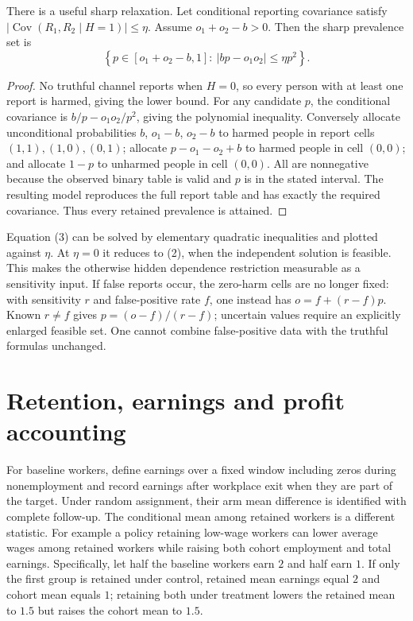 \documentclass[11pt,a4paper]{article}
\DeclareMathOperator{\Cov}{Cov}
\begin{document}
There is a useful sharp relaxation. Let conditional reporting covariance satisfy
$|\Cov(R_1,R_2\mid H=1)|\le\eta$. Assume $o_1+o_2-b>0$. Then the sharp prevalence set is
\[
 \left\{p\in[o_1+o_2-b,1]:\ |bp-o_1o_2|\le\eta p^2\right\}.
\tag{3}
\]
\begin{proof}
No truthful channel reports when $H=0$, so every person with at least one report is harmed, giving the lower bound. For any candidate $p$, the conditional covariance is $b/p-o_1o_2/p^2$, giving the polynomial inequality. Conversely allocate unconditional probabilities $b$, $o_1-b$, $o_2-b$ to harmed people in report cells $(1,1),(1,0),(0,1)$; allocate $p-o_1-o_2+b$ to harmed people in cell $(0,0)$; and allocate $1-p$ to unharmed people in cell $(0,0)$. All are nonnegative because the observed binary table is valid and $p$ is in the stated interval. The resulting model reproduces the full report table and has exactly the required covariance. Thus every retained prevalence is attained.
\end{proof}
Equation (3) can be solved by elementary quadratic inequalities and plotted against $\eta$. At $\eta=0$ it reduces to (2), when the independent solution is feasible. This makes the otherwise hidden dependence restriction measurable as a sensitivity input. If false reports occur, the zero-harm cells are no longer fixed: with sensitivity $r$ and false-positive rate $f$, one instead has $o=f+(r-f)p$. Known $r\ne f$ gives $p=(o-f)/(r-f)$; uncertain values require an explicitly enlarged feasible set. One cannot combine false-positive data with the truthful formulas unchanged.

\section{Retention, earnings and profit accounting}
For baseline workers, define earnings over a fixed window including zeros during nonemployment and record earnings after workplace exit when they are part of the target. Under random assignment, their arm mean difference is identified with complete follow-up. The conditional mean among retained workers is a different statistic. For example a policy retaining low-wage workers can lower average wages among retained workers while raising both cohort employment and total earnings. Specifically, let half the baseline workers earn $2$ and half earn $1$. If only the first group is retained under control, retained mean earnings equal $2$ and cohort mean equals $1$; retaining both under treatment lowers the retained mean to $1.5$ but raises the cohort mean to $1.5$.
\end{document}
